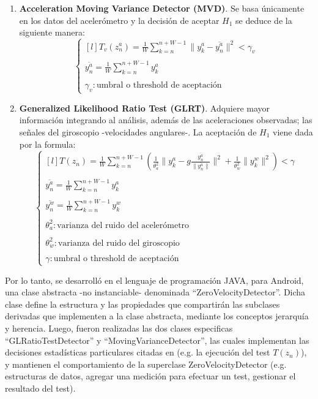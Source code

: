 \begin{enumerate}
    \item \textbf{Acceleration Moving Variance Detector (MVD)}. Se basa únicamente en los datos del acelerómetro y la decisión de aceptar $H_1$ se deduce de la siguiente manera:
   \[\left\{ 
     \begin{matrix*}[l]
     T_v(z_n^a) = \frac{1}{W} \sum_{k=n}^{n+W-1}\lVert y_k^a - \overline{y_n^a} \rVert^2 < \gamma_v\\\\
     \overline{y_n^a} = \frac{1}{W}\sum_{k=n}^{n+W-1}y_k^a\\\\
     \gamma_v: \text{umbral o threshold de aceptación}
    \end{matrix*}
    \right. \]
    
    \item \textbf{
Generalized Likelihood Ratio Test (GLRT)}. Adquiere mayor información integrando al análisis, además de las aceleraciones observadas; las señales del giroscopio -velocidades angulares-. La aceptación de $H_1$ viene dada por la formula:
\[\left\{ 
     \begin{matrix*}[l]
     T(z_n) = \frac{1}{W} \sum_{k=n}^{n+W-1}(\frac{1}{\theta_a^2}\lVert y_k^a -g \frac{\overline{y_n^a}}{\lVert \overline{y_n^a}\rVert} \rVert^2 + \frac{1}{\theta_w^2}\lVert y_k^w\rVert^2) < \gamma\\\\
     \overline{y_n^a} = \frac{1}{W}\sum_{k=n}^{n+W-1}y_k^a\\\\
     \overline{y_n^w} = \frac{1}{W}\sum_{k=n}^{n+W-1}y_k^w\\\\
     \theta_a^2:\text{varianza del ruido del acelerómetro}\\\\
     \theta_w^2: \text{varianza del ruido del giroscopio}\\\\
     \gamma: \text{umbral o threshold de aceptación}
    \end{matrix*}
    \right. \]

\end{enumerate}

Por lo tanto, se desarrolló en el lenguaje de programación JAVA, para Android, una clase abstracta -no instanciable- denominada ``ZeroVelocityDetector''. Dicha clase define la estructura y las propiedades que compartirán las subclases derivadas que implementen a la clase abstracta, mediante los conceptos jerarquía y herencia. Luego, fueron realizadas las dos clases especificas ``GLRatioTestDetector'' y ``MovingVarianceDetector'', las cuales implementan las decisiones estadísticas particulares citadas en  (e.g. la ejecución del test $ T(z_n) $), y mantienen el comportamiento de la superclase ZeroVelocityDetector (e.g. estructuras de datos, agregar una medición para efectuar un test, gestionar el resultado del test). 

